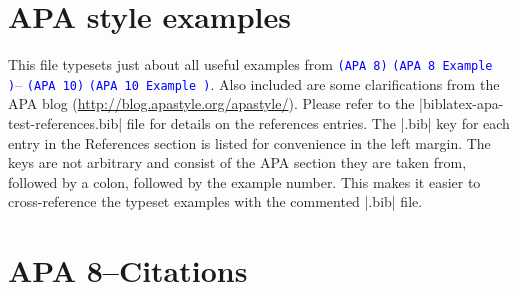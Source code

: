 \documentclass[paper=a4]{article}
\newcommand\apa[2][]{\ifthenelse{\equal{#1}{}}%
                       {\textcolor{blue}{\texttt{(APA #2)}}}%
                       {\textcolor{blue}{\texttt{(APA #2 Example #1)}}}}
\begin{document}
\section{APA style examples}
This file typesets just about all useful examples from \apa{8}--\apa{10}.
Also included are some clarifications from the APA blog
(\url{http://blog.apastyle.org/apastyle/}). Please refer to the
|biblatex-apa-test-references.bib| file for details on the references
entries. The |.bib| key for each entry in the References section is listed
for convenience in the left margin. The keys are not arbitrary and consist
of the APA section they are taken from, followed by a colon,
followed by the example number. This makes it easier to cross-reference the
typeset examples with the commented |.bib| file.

\tableofcontents
\newpage
\section{APA 8--Citations}
\end{document}
